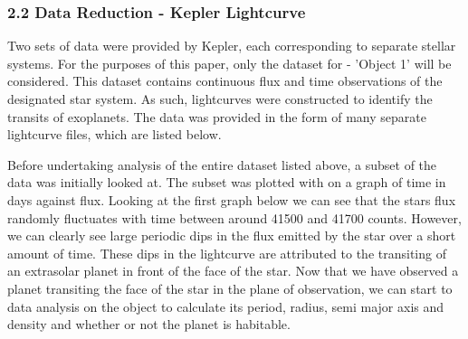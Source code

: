 \documentclass[11pt]{article}
\begin{document}
    \subsubsection{2.2 Data Reduction - Kepler
Lightcurve}\label{data-reduction---kepler-lightcurve}

    Two sets of data were provided by Kepler, each corresponding to separate
stellar systems. For the purposes of this paper, only the dataset for -
'Object 1' will be considered. This dataset contains continuous flux and
time observations of the designated star system. As such, lightcurves
were constructed to identify the transits of exoplanets. The data was
provided in the form of many separate lightcurve files, which are listed
below.

Before undertaking analysis of the entire dataset listed above, a subset
of the data was initially looked at. The subset was plotted with on a
graph of time in days against flux. Looking at the first graph below we
can see that the stars flux randomly fluctuates with time between around
41500 and 41700 counts. However, we can clearly see large periodic dips
in the flux emitted by the star over a short amount of time. These dips
in the lightcurve are attributed to the transiting of an extrasolar
planet in front of the face of the star. Now that we have observed a
planet transiting the face of the star in the plane of observation, we
can start to data analysis on the object to calculate its period,
radius, semi major axis and density and whether or not the planet is
habitable.
\end{document}
